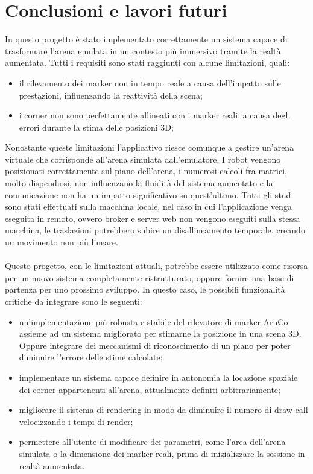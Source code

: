 \documentclass[12pt,a4paper,openright,oneside]{book}
\begin{document}
\chapter{Conclusioni e lavori futuri}\label{chap:conclusioni} %
In questo progetto è stato implementato correttamente un sistema capace di trasformare l'arena emulata in un contesto più immersivo tramite la realtà aumentata.
Tutti i requisiti sono stati raggiunti con alcune limitazioni, quali:
\begin{itemize}
    \item il rilevamento dei marker non in tempo reale a causa dell'impatto sulle prestazioni, influenzando la reattività della scena;
    \item i corner non sono perfettamente allineati con i marker reali, a causa degli errori durante la stima delle posizioni 3D;
\end{itemize}
Nonostante queste limitazioni l'applicativo riesce comunque a gestire un'arena virtuale che corrisponde all'arena simulata dall'emulatore. I robot vengono posizionati correttamente sul piano dell'arena, i numerosi calcoli fra matrici, molto dispendiosi, non influenzano la fluidità del sistema aumentato e la comunicazione non ha un impatto significativo su quest'ultimo. Tutti gli studi sono stati effettuati sulla macchina locale, nel caso in cui l'applicazione venga eseguita in remoto, ovvero broker e server web non vengono eseguiti sulla stessa macchina, le traslazioni potrebbero subire un disallineamento temporale, creando un movimento non più lineare.
\\
\\
Questo progetto, con le limitazioni attuali, potrebbe essere utilizzato come risorsa per un nuovo sistema completamente ristrutturato, oppure fornire una base di partenza per uno prossimo sviluppo. In questo caso, le possibili funzionalità critiche da integrare sono le seguenti:
\begin{itemize}
    \item un'implementazione più robusta e stabile del rilevatore di marker AruCo assieme ad un sistema migliorato per stimarne la posizione in una scena 3D. Oppure integrare dei meccanismi di riconoscimento di un piano per poter diminuire l'errore delle stime calcolate;
    \item implementare un sistema capace definire in autonomia la locazione spaziale dei corner appartenenti all'arena, attualmente definiti arbitrariamente;
    \item migliorare il sistema di rendering in modo da diminuire il numero di draw call velocizzando i tempi di render;
    \item permettere all'utente di modificare dei parametri, come l'area dell'arena simulata o la dimensione dei marker reali, prima di inizializzare la sessione in realtà aumentata.
\end{itemize}
\end{document}

